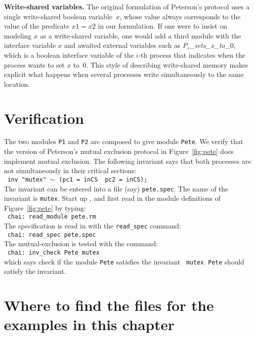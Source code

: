 \mypar
{\bf Write-shared variables.}
The original formulation of Peterson's protocol uses a single write-shared
boolean variable~$x$, whose value always corresponds to the value of the
predicate $x1=x2$ in our formulation.
If one were to insist on modeling $x$ as a write-shared variable, one would
add a third module with the interface variable $x$ and awaited external
variables such as {\em P$_i$\_sets\_x\_to\_}0, which is a boolean interface
variable of the $i$-th process that indicates when the process wants to set
$x$ to~0.
This style of describing write-shared memory makes explicit what happens when
several processes write simultaneously to the same location.

\section{Verification}
The two modules {\tt P1} and {\tt P2} are composed to give module {\tt Pete}. 
We verify that the version of Peterson's mutual exclusion
protocol in Figure~\ref{fig:pete} does implement mutual exclusion. 
The following invariant says that both processes are not simultaneously in their
critical sections:\\

{\noindent\tt
inv "mutex" $\sim$ (pc1 = inCS \AND\ pc2 = inCS);
}\\

The invariant can be entered into a file (say) {\tt pete.spec}.
The name of the invariant is {\tt mutex}.
Start up \chai, and first read in the
module definitions of Figure~\ref{fig:pete} by typing:\\

{\noindent\tt
chai: read\_module pete.rm
}\\

\noindent
The specification is read in with the {\tt read\_spec} command:\\

{\noindent\tt
chai: read\_spec pete.spec
}\\

\noindent
The mutual-exclusion is tested with the command:\\

{\noindent\tt
chai:  inv\_check Pete mutex
}\\

\noindent
which says check if the module {\tt Pete} satisfies the invariant {\tt
mutex}. {\tt Pete} should satisfy the invariant. 

\section{Where to find the files for the examples in this chapter}

